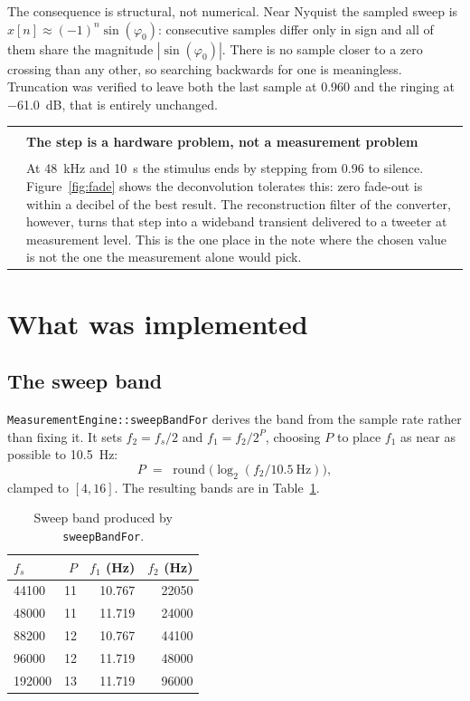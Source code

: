 \documentclass[11pt,a4paper]{article}
\makeatletter
\newcommand{\code}[1]{\texttt{\small #1}}
\newenvironment{remark}[1]
  {\par\medskip\noindent\begin{tabular}{@{}p{0.03\textwidth}p{0.93\textwidth}@{}}
   \textcolor{smtblue}{\rule{2pt}{\baselineskip}} & \textbf{#1}\\[2pt] & \ignorespaces}
  {\end{tabular}\par\medskip}
\makeatother
\begin{document}
The consequence is structural, not numerical. Near Nyquist the sampled sweep is
$x[n] \approx (-1)^n \sin(\varphi_0)$: consecutive samples differ only in sign
and all of them share the magnitude $|\sin(\varphi_0)|$. There is no sample
closer to a zero crossing than any other, so searching backwards for one is
meaningless. Truncation was verified to leave both the last sample at
\num{0.960} and the ringing at \SI{-61.0}{\dB}, that is entirely unchanged.

\begin{remark}{The step is a hardware problem, not a measurement problem}
At \SI{48}{\kilo\hertz} and \SI{10}{\second} the stimulus ends by stepping from
\num{0.96} to silence. Figure~\ref{fig:fade} shows the deconvolution tolerates
this: zero fade-out is within a decibel of the best result. The reconstruction
filter of the converter, however, turns that step into a wideband transient
delivered to a tweeter at measurement level. This is the one place in the note
where the chosen value is not the one the measurement alone would pick.
\end{remark}

\section{What was implemented}
\label{sec:impl}

\subsection{The sweep band}

\code{MeasurementEngine::sweepBandFor} derives the band from the sample rate
rather than fixing it. It sets $f_2 = f_s/2$ and $f_1 = f_2 / 2^P$, choosing
$P$ to place $f_1$ as near as possible to \SI{10.5}{\hertz}:
%
\begin{equation}
  P \;=\; \operatorname{round}\bigl( \log_2 (f_2 / \SI{10.5}{\hertz}) \bigr),
\end{equation}
%
clamped to $[4, 16]$. The resulting bands are in Table~\ref{tab:bands}.

\begin{table}[h]
\centering
\caption{Sweep band produced by \code{sweepBandFor}.}
\label{tab:bands}
\begin{tabular}{lrrr}
\toprule
$f_s$ & $P$ & $f_1$ (Hz) & $f_2$ (Hz) \\
\midrule
\SI{44100}{}  & 11 & 10.767 & 22050 \\
\SI{48000}{}  & 11 & 11.719 & 24000 \\
\SI{88200}{}  & 12 & 10.767 & 44100 \\
\SI{96000}{}  & 12 & 11.719 & 48000 \\
\SI{192000}{} & 13 & 11.719 & 96000 \\
\bottomrule
\end{tabular}
\end{table}
\end{document}
